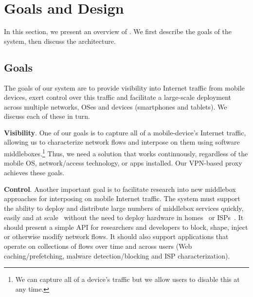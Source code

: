 \section{Goals and Design}
\label{sec:goals}

In this section, we present an overview of \meddle. We first describe the goals of the 
system, then discuss the \meddle architecture. 


\subsection{Goals}

The goals of our system are to provide visibility into Internet traffic from mobile devices, 
exert control over this traffic and facilitate a large-scale deployment across multiple 
networks, OSes and devices (smartphones and tablets). We discuss each of these in turn.

\noindent\textbf{Visibility}. One of our goals is to capture all of a mobile-device's Internet traffic,
allowing us to characterize network flows and interpose on them using software middleboxes.\footnote{We can capture all of a device's traffic but we allow users to disable this at any time.}  Thus, 
we need a solution that works continuously, regardless of the mobile OS, network/access 
technology, or apps installed. Our VPN-based proxy achieves these goals. 
  
\noindent\textbf{Control}. Another important goal is to facilitate research into new middlebox approaches 
for interposing on mobile Internet traffic. The system must support the ability to deploy and distribute large numbers 
of middlebox services quickly, easily and at scale~\cite{sherry:middleboxes} without 
the need to deploy hardware in homes~\cite{bismark} or ISPs~\cite{wang:middleboxes}. 
It should present a simple API for researchers and developers to block, shape, inject or otherwise 
modify network flows. It should also support applications that operate on collections of flows over 
time and across users (\eg Web caching/prefetching, malware detection/blocking and ISP characterization). 

